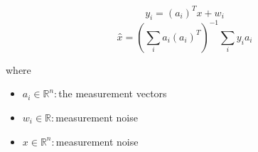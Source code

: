 \documentclass[12pt]{article}
\begin{document}
\[
\textit{y}_{ \textit{i} } = (\textit{a}_{ \textit{i} })^T\textit{x} + \textit{w}_{ \textit{i} }
\]
\[
\textit{x̂} = (\sum_\textit{i} \textit{a}_{ \textit{i} }(\textit{a}_{ \textit{i} })^T)^{-1}\sum_\textit{i} \textit{y}_{ \textit{i} }\textit{a}_{ \textit{i} }
\]

where
\begin{itemize}
\item $\textit{a}_{\textit{i}} \in \mathbb{R}^{ \textit{n}}:$the measurement vectors  
\item $\textit{w}_{\textit{i}} \in \mathbb{{R}}:$measurement noise 
\item $\textit{x} \in \mathbb{R}^{ \textit{n}}:$measurement noise 
\end{itemize}
\end{document}
